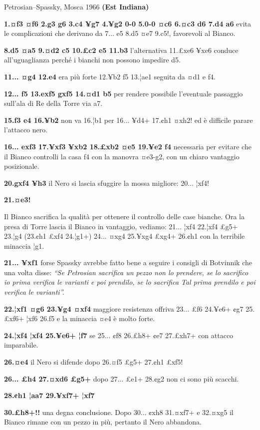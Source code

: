 Petrosian--Spassky, Mosca 1966 \textbf{(Est Indiana)}

\textbf{1.¤f3 ¤f6 2.g3 g6 3.c4 ¥g7 4.¥g2 0-0 5.0-0 ¤c6 6.¤c3 d6 7.d4 a6}
evita le complicazioni che derivano da 7... e5 8.d5 ¤e7 9.c5!,
favorevoli al Bianco.

\textbf{8.d5 ¤a5 9.¤d2 c5 10.£c2 e5 11.b3} l'alternativa 11.£xe6 ¥xe6
conduce all'uguaglianza perché i bianchi non possono impedire d5.

\textbf{11... ¤g4 12.e4} era più forte 12.¥b2 f5 13.¦ae1 seguita da ¤d1
e f4.

\textbf{12... f5 13.exf5 gxf5 14.¤d1 b5} per rendere possibile
l'eventuale passaggio sull'ala di Re della Torre via a7.

\textbf{15.f3 e4 16.¥b2} non va 16.¦b1 per 16... ¥d4+ 17.¢h1 ¤xh2! ed è
difficile parare l'attacco nero.

\textbf{16... exf3 17.¥xf3 ¥xb2 18.£xb2 ¤e5 19.¥e2 f4} necessaria per
evitare che il Bianco controlli la casa f4 con la manovra ¤e3-g2, con un
chiaro vantaggio posizionale.

\textbf{20.gxf4 ¥h3} il Nero si lascia sfuggire la mossa migliore: 20...
¦xf4!

\textbf{21.¤e3!}


Il Bianco sacrifica la qualità per ottenere il controllo delle case
bianche. Ora la presa di Torre lascia il Bianco in vantaggio, vediamo:
21... ¦xf4 22.¦xf4 £g5+ 23.¦g4 (23.¢h1 £xf4 24.¦g1+) 24... ¤xg4 25.¥xg4
£xg4+ 26.¢h1 con la terribile minaccia ¦g1.

\textbf{21... ¥xf1} forse Spassky avrebbe fatto bene a seguire i
consigli di Botvinnik che una volta disse: \emph{``Se Petrosian
sacrifica un pezzo non lo prendere, se lo sacrifico io prima verifica le
varianti e poi prendilo, se lo sacrifica Tal prima prendilo e poi
verifica le varianti''.}

\textbf{22.¦xf1 ¤g6 23.¥g4 ¤xf4} maggiore resistenza offriva 23... £f6
24.¥e6+ ¢g7 25.£xf6+ ¦xf6 26.f5 e la minaccia ¤e4 è molto forte.

\textbf{24.¦xf4 ¦xf4 25.¥e6+ ¦f7} se 25... ¢f8 26.£h8+ ¢e7 27.£xh7+ con
attacco imparabile.

\textbf{26.¤e4} il Nero si difende dopo 26.¤f5 £g5+ 27.¢h1 £xf5!

\textbf{26... £h4 27.¤xd6 £g5+} dopo 27... £e1+ 28.¢g2 non ci sono più
scacchi.

\textbf{28.¢h1 ¦aa7 29.¥xf7+ ¦xf7}


\textbf{30.£h8+!!} una degna conclusione. Dopo 30... ¢xh8 31.¤xf7+ e
32.¤xg5 il Bianco rimane con un pezzo in più, pertanto il Nero
abbandona.
